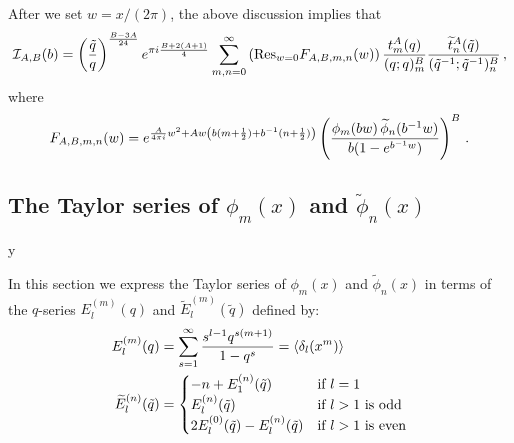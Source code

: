 \documentclass[12pt]{amsart}
\theoremstyle{definition}
\def\printname#1{
        \if\draft y
                \smash{\makebox[0pt]{\hspace{-0.5in}
                        \raisebox{8pt}{\tt\tiny #1}}}
        \fi
}
\def\lbl#1{\label{#1}\printname{#1}}
\def\calI{\mathcal I}
\def\la{\langle}
\def\ra{\rangle}
\def\ti{\widetilde}
\def\tq{\tilde{q}}
\def\Res{\mathrm{Res}}
\def\d{\delta}
\begin{document}
After we set $w=x/(2\pi)$, the above discussion implies that
\begin{equation}
\lbl{eq.III}
\calI_{A,B}(b)=\left(\frac{\tq}{q}\right)^{\frac{B-3A}{24}} 
e^{\pi i \frac{B+2(A+1)}{4}} \sum_{m,n=0}^\infty  \left(\Res_{w=0} F_{A,B,m,n}(w)\right)
 \frac{t^A_m(q)}{(q;q)_m^B}
\frac{\ti t^A_n(\tq)}{(\tq^{-1};\tq^{-1})_n^B} \,,
\end{equation}
where
\begin{equation}
\lbl{eq.FABmn}
F_{A,B,m,n}(w) =
e^{\frac{A}{4 \pi i} w^2 + A w \left(b( m+ \frac{1}{2}) 
+b^{-1}( n+ \frac{1}{2}) \right)} 
\left( \frac{ \phi_m(b w) \, \ti \phi_n(b^{-1} w) }{b(1-e^{b^{-1}w})}\right)^B 
\,.
\end{equation}

\subsection{The Taylor series of $\phi_m(x)$ and $\ti\phi_n(x)$}
\lbl{sub.identify}

In this section we express the Taylor series of $\phi_m(x)$ and $\ti\phi_n(x)$
in terms of the $q$-series $E^{(m)}_l(q)$ and $\ti E^{(m)}_l(\tq)$
defined by:
\begin{subequations}
\begin{align}
\lbl{eq.Elm}
E_l^{(m)}(q)&=\sum_{s=1}^\infty \frac{s^{l-1} q^{s(m+1)}}{1-q^s} =
\la \d_l(x^m) \ra
\\
\lbl{eq.Etlm}
\ti E_l^{(n)}(\tq)&=
\begin{cases}
-n + E_1^{(n)}(\tq) & \text{if $l=1$} \\
E_l^{(n)}(\tq)  & \text{if $l>1$ is odd} \\
2 E_l^{(0)}(\tq) -E_l^{(n)}(\tq) & \text{if $l>1$ is even} 
\end{cases}
\end{align}
\end{subequations}
\end{document}
